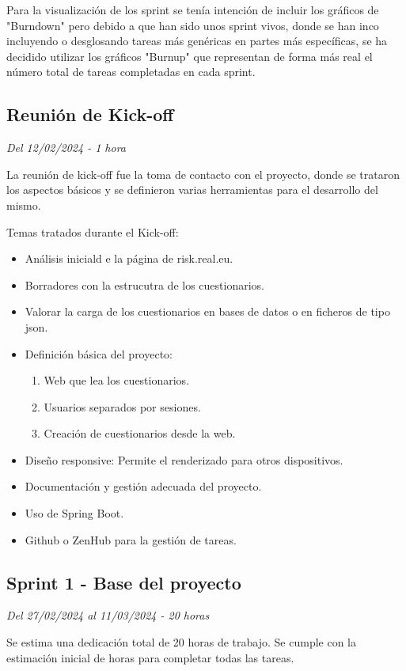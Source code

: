 Para la visualización de los sprint se tenía intención de incluir los gráficos de "Burndown" pero debido a que han sido unos sprint vivos, donde se han inco incluyendo o desglosando tareas más genéricas en partes más específicas, se ha decidido utilizar los gráficos "Burnup" que representan de forma más real el número total de tareas completadas en cada sprint.

\subsection{Reunión de Kick-off}
\textit{Del 12/02/2024 - 1 hora}

La reunión de kick-off fue la toma de contacto con el proyecto, donde se trataron los aspectos básicos y se definieron varias herramientas para el desarrollo del mismo.

Temas tratados durante el Kick-off:
\begin{itemize}
	\item
	Análisis iniciald e la página de risk.real.eu.
	\item
	Borradores con la estrucutra de los cuestionarios.
	\item
	Valorar la carga de los cuestionarios en bases de datos o en ficheros de tipo json.
	\item
	Definición básica del proyecto:
	\begin{enumerate}
		\item
		Web que lea los cuestionarios.
		\item
		Usuarios separados por sesiones.
		\item
		Creación de cuestionarios desde la web.
	\end{enumerate}
	\item
	Diseño responsive: Permite el renderizado para otros dispositivos.
	\item
	Documentación y gestión adecuada del proyecto.
	\item
	Uso de Spring Boot.
	\item
	Github o ZenHub para la gestión de tareas.
\end{itemize}


\subsection{Sprint 1 - Base del proyecto}
\textit{Del 27/02/2024 al 11/03/2024 - 20 horas}

Se estima una dedicación total de 20 horas de trabajo.
Se cumple con la estimación inicial de horas para completar todas las tareas.

